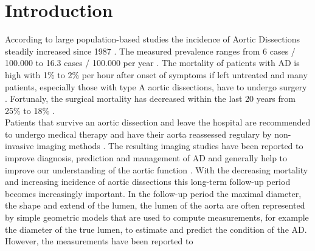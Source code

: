 \documentclass[thesis.tex]{subfiles}
\begin{document}
\chapter{Introduction}
\label{chap:introduction}


According to large population-based studies the incidence of Aortic Dissections steadily increased since 1987 \cite{olsson2007thoracic}. The measured prevalence ranges from 6 cases / 100.000 to 16.3 cases / 100.000 per year \cite{olsson2007thoracic,goldfinger2014thoracic}. The mortality of patients with AD is high with 1\% to 2\% per hour after onset of symptoms if left untreated \cite{doi:10.1161/CIRCULATIONAHA.117.031264,meszaros2000epidemiology,goldfinger2014thoracic} and many patients, especially those with type A aortic dissections, have to undergo surgery \cite{doi:10.1161/CIRCULATIONAHA.117.031264}.  Fortunaly, the surgical mortality has decreased within the last 20 years from 25\% to 18\% \cite{doi:10.1161/CIRCULATIONAHA.117.031264}. \\
Patients that survive an aortic dissection and leave the hospital are recommended to undergo medical therapy and have their aorta reassessed regulary by non-invasive imaging methods \cite{olsson2007thoracic,desanctis1987aortic,baliga2014role}. The resulting imaging studies have been reported to improve diagnosis, prediction and management of AD \cite{doi:10.1161/CIRCULATIONAHA.117.031264} and generally help to improve our understanding of the aortic function \cite{baliga2014role}. With the decreasing mortality and increasing incidence of aortic dissections this long-term follow-up period becomes increasingly important. In the follow-up period the maximal diameter, the shape and extend of the lumen, the  lumen of the aorta are often represented by simple geometric models that are used to compute measurements, for example the diameter of the true lumen, to estimate and predict the condition of the AD. However, the measurements have been reported to 
\\
\end{document}
